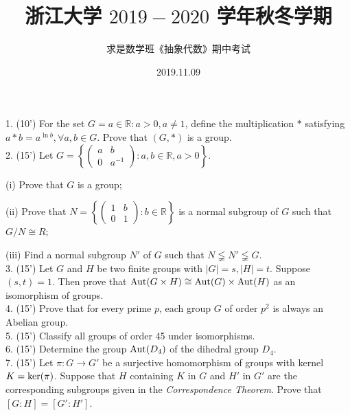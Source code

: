 \documentclass[UTF8]{ctexart}
\title{\LARGE \textbf{浙江大学 $2019-2020$ 学年秋冬学期}}
\author{求是数学班《抽象代数》期中考试}
\date{2019.11.09}
\begin{document}
\maketitle

1. (10') For the set $G={a\in\mathbb{R}:a>0,a\neq1}$, define the multiplication $*$ satisfying $a*b=a^{\ln b},\forall a,b\in G$. Prove that $(G,*)$ is a group.
\\

2. (15') Let $G=\left\{
                \left(\begin{matrix}
                            a & b \\
                            0 & a^{-1}
                            \end{matrix}\right):a,b\in\mathbb{R},a>0
                \right\}$.

(i)  Prove that $G$ is a group;

(ii) Prove that $N=\left\{
                    \left(\begin{matrix}
                        1 & b \\
                        0 & 1
                        \end{matrix}\right):b\in\mathbb{R}
                    \right\}$ is a normal subgroup of $G$ such that $G/N\cong R$;

(iii) Find a normal subgroup $N'$ of $G$ such that $N \lneqq N' \lneqq G$.
\\

3. (15') Let $G$ and $H$ be two finite groups with $|G|=s, |H|=t$. Suppose $(s,t)=1$. Then prove that ${\rm Aut}(G\times H) \cong {\rm Aut}(G)\times{\rm Aut}(H)$ as an isomorphism of groups.
\\

4. (15') Prove that for every prime $p$, each group $G$ of order $p^2$ is always an Abelian group.
\\

5. (15') Classify all groups of order 45 under isomorphisms.
\\

6. (15') Determine the group ${\rm Aut}(D_4)$ of the dihedral group $D_4$.
\\

7. (15') Let $\pi : G \rightarrow G'$ be a surjective homomorphism of groups with kernel $K={\rm ker} (\pi)$. Suppose that $H$ containing $K$ in $G$ and $H'$ in $G'$ are the corresponding subgroups given in the \textit{Correspondence Theorem}. Prove that $[G:H]=[G':H']$.
\end{document}
